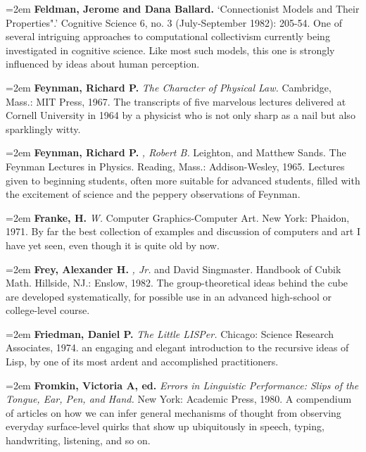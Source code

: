 \par\noindent\hangindent=2em {\bf Feldman, Jerome and Dana Ballard.} `Connectionist Models and Their Properties".' Cognitive Science 6, no. 3 (July-September 1982): 205-54. One of several intriguing approaches to computational collectivism currently being investigated in cognitive science. Like most such models, this one is strongly influenced by ideas about human perception.

\par\noindent\hangindent=2em {\bf Feynman, Richard P.} {\it The Character of Physical Law.} Cambridge, Mass.: MIT Press, 1967. The transcripts of five marvelous lectures delivered at Cornell University in 1964 by a physicist who is not only sharp as a nail but also sparklingly witty.

\par\noindent\hangindent=2em {\bf Feynman, Richard P.} {\it , Robert B.} Leighton, and Matthew Sands. The Feynman Lectures in Physics. Reading, Mass.: Addison-Wesley, 1965. Lectures given to beginning students, often more suitable for advanced students, filled with the excitement of science and the peppery observations of Feynman.

\par\noindent\hangindent=2em {\bf Franke, H.} {\it W.} Computer Graphics-Computer Art. New York: Phaidon, 1971. By far the best collection of examples and discussion of computers and art I have yet seen, even though it is quite old by now.

\par\noindent\hangindent=2em {\bf Frey, Alexander H.} {\it , Jr.} and David Singmaster. Handbook of Cubik Math. Hillside, NJ.: Enslow, 1982. The group-theoretical ideas behind the cube are developed systematically, for possible use in an advanced high-school or college-level course.

\par\noindent\hangindent=2em {\bf Friedman, Daniel P.} {\it The Little LISPer.} Chicago: Science Research Associates, 1974. an engaging and elegant introduction to the recursive ideas of Lisp, by one of its most ardent and accomplished practitioners.

\par\noindent\hangindent=2em {\bf Fromkin, Victoria A, ed.} {\it Errors in Linguistic Performance: Slips of the Tongue, Ear, Pen, and Hand.} New York: Academic Press, 1980. A compendium of articles on how we can infer general mechanisms of thought from observing everyday surface-level quirks that show up ubiquitously in speech, typing, handwriting, listening, and so on.

